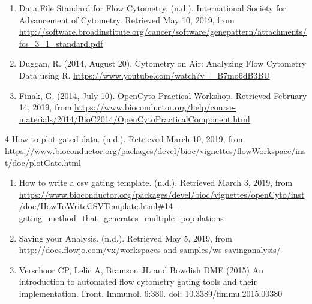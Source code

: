 \documentclass[]{book}
\begin{document}
\begin{enumerate}
\def\labelenumi{\arabic{enumi}.}
\item
  Data File Standard for Flow Cytometry. (n.d.). International Society for Advancement of Cytometry.
  Retrieved May 10, 2019,
  from \url{http://software.broadinstitute.org/cancer/software/genepattern/attachments/fcs_3_1_standard.pdf}
\item
  Duggan, R. (2014, August 20). Cytometry on Air: Analyzing Flow Cytometry Data using R.
  \url{https://www.youtube.com/watch?v=_B7mo6dB3BU}
\item
  Finak, G. (2014, July 10). OpenCyto Practical Workshop. Retrieved February 14, 2019, from
  \url{https://www.bioconductor.org/help/course-materials/2014/BioC2014/OpenCytoPracticalComponent.html}
\end{enumerate}

4 How to plot gated data. (n.d.). Retrieved March 10, 2019, from \url{https://www.bioconductor.org/packages/devel/bioc/vignettes/flowWorkspace/inst/doc/plotGate.html}

\begin{enumerate}
\def\labelenumi{\arabic{enumi}.}
\setcounter{enumi}{4}
\item
  How to write a csv gating template. (n.d.). Retrieved March 3, 2019, from
  \url{https://www.bioconductor.org/packages/devel/bioc/vignettes/openCyto/inst/doc/HowToWriteCSVTemplate.html\#14_}
  gating\_method\_that\_generates\_multiple\_populations
\item
  Saving your Analysis. (n.d.). Retrieved May 5, 2019, from
  \url{http://docs.flowjo.com/vx/workspaces-and-samples/ws-savinganalysis/}
\item
  Verschoor CP, Lelic A, Bramson JL and Bowdish DME (2015) An introduction to automated
  flow cytometry gating tools and their implementation. Front. Immunol. 6:380.
  doi: 10.3389/fimmu.2015.00380
\end{enumerate}
\end{document}

